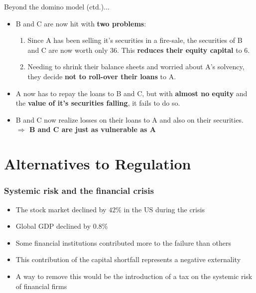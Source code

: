 \documentclass[11pt]{beamer}
\newcommand{\mcdr}[1]{{{\bf \color{red4}#1}}}
\begin{document}
\begin{frame}
\begin{block}{Beyond the domino model (ctd.)...}
  \begin{itemize}
   \item B and C are now hit with \mcdr{two problems}:
   \begin{enumerate}
    \item Since A has been selling it's securities in a fire-sale, the securities of B and C are now worth only 36. This \mcdr{reduces their equity capital} to 6.
    \item Needing to shrink their balance sheets and worried about A's solvency, they decide \mcdr{not to roll-over their loans} to A.
   \end{enumerate}
   \item A now has to repay the loans to B and C, but with \mcdr{almost no equity} and the \mcdr{value of it's securities falling}, it fails to do so.
   \item B and C now realize losses on their loans to A and also on their securities.\\
\hfill\mcdr{$\Rightarrow$ B and C are just as vulnerable as A}
  \end{itemize}
\end{block}
\end{frame}

%
\section{Alternatives to Regulation}
%
\begin{frame}
\begin{center}
\end{center}
\end{frame}


\begin{frame}
\frametitle{Systemic risk and the financial crisis}
\begin{itemize}
\item The stock market declined by $42$\% in the US during the crisis
\item Global GDP declined by $0.8$\%
\item Some financial institutions contributed more to the failure than others
\item This contribution of the capital shortfall represents a negative externality
\item A way to remove this would be the introduction of a tax on the systemic risk of financial firms
\end{itemize}
\end{frame}
\end{document}
